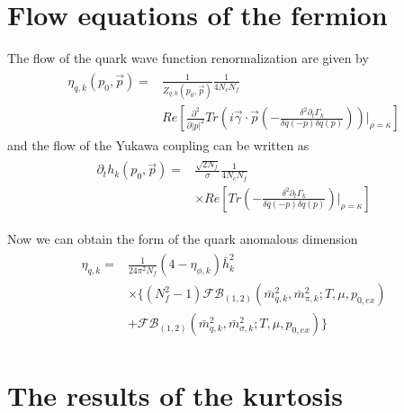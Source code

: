 \documentclass[%
reprint,
superscriptaddress,
showpacs,preprintnumbers,
 amsmath,amssymb,
 aps,
prd,
]{revtex4-1}
\begin{document}
\section{Flow equations of the fermion}\label{c}
The flow of the quark wave function renormalization are given by
\begin{align}
\begin{split}
\eta_{q,k}(p_0,\vec{p})=&\frac{1}{Z_{q,k}(p_0,\vec{p})}\frac{1}{4N_cN_f}\\
&Re\left[\frac{\partial^2}{\partial|p|^2}Tr\left( i\vec{\gamma}\cdot \vec{p}\left( -\frac{\delta^2\partial_t\Gamma_k}
{\delta\bar{q}(-p)\delta q(p)} \right) \right)\bigg|_{\rho=\kappa}\right]
\end{split}
\end{align} 
and the flow of the Yukawa coupling can be written as
\begin{align}
\begin{split}
\partial_th_k(p_0,\vec{p})=&\frac{\sqrt{2N_f}}{\sigma}\frac{1}{4N_cN_f}\\
&\times Re\left[ Tr\left( -\frac{\delta^2\partial_t\Gamma_k}{\delta\bar{q}(-p)\delta q(p)} \right)\bigg|_{\rho=\kappa} \right]
\end{split}
\end{align} 






Now we can obtain the form of the quark anomalous dimension
\begin{align}
\begin{split}
\eta_{q,k}=&\frac{1}{24\pi^2N_f}(4-\eta_{\phi,k})\bar{h}^{2}_{k}\\
&\times\{ (N^{2}_{f}-1)\mathcal{FB}_{(1,2)}(\bar{m}^{2}_{q,k},\bar{m}^{2}_{\pi,k};T,\mu,p_{0,ex})\\
&+\mathcal{FB}_{(1,2)}(\bar{m}^{2}_{q,k},\bar{m}^{2}_{\sigma,k};T,\mu,p_{0,ex}) \}
\end{split}
\end{align} 




\section{The results of the kurtosis}
\end{document}
